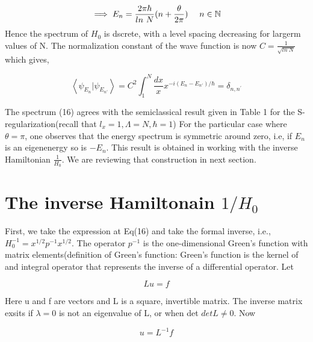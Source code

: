 \documentclass[12pt]{report}
\newcommand*{\1}{\hspace{1pt}}
\begin{document}
        \begin{equation}
            \implies E_{n}  = \frac{2\pi\hbar}{ln \ N}(n+\frac{\theta}{2\pi})  \ \ \ \ n \in \mathbb{N}\\
        \end{equation}
        Hence the spectrum of $H_{0}$ is dscrete, with a level spacing decreasing for largerm values of N. The normalization constant of the wave function is now 
        $C = \frac{1}{\sqrt{ln \ N}}$ which gives,

        \begin{equation}
            \left\langle\psi_{E_{n}}|\psi_{E_{n'}}\right\rangle = C^{2} \int_{1}^{N} \frac{dx}{x} x^{-i(E_{n}-E_{n'})/\hbar} = \delta_{n,n^{'}}
        \end{equation}
        
        The spectrum (16) agrees with the semiclassical result given in Table 1 for the S-regularization(recall that $l_{x} = 1, \Lambda = N, \hbar=1$)
        For the particular case where $\theta=\pi$, one observes that the energy spectrum is symmetric around zero, i.e, if $E_{n}$ is an eigenenergy so is $-E_{n}$.
        This result is obtained in working\cite{s10} with the inverse Hamiltonian $\frac{1}{H_{0}}$. We are reviewing that construction in next section.

        \section{The inverse Hamiltonain $1/H_{0}$}

        First, we take the expression at Eq(16) and take the formal inverse, i.e., $H_{0} ^{-1} = x^{1/2}p^{-1}x^{1/2}$. The operator $p^{-1}$ is the one-dimensional
        Green's function with matrix elements(definition of Green's function: Green's function is the kernel of and integral operator that represents the inverse
        of a differential operator. Let 

        \begin{equation}
                Lu = f
        \end{equation}

        Here u and f are vectors and L is a square, invertible matrix. The inverse matrix exsits if $\lambda=0$ is not an eigenvalue of L, or when det $det L \neq 0$.
        Now

        \begin{equation}
            u = L^{-1}f
        \end{equation}
\end{document}
